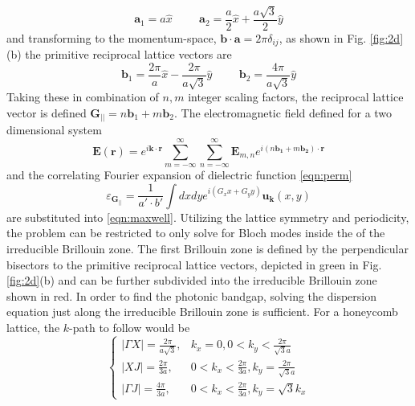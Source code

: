 \begin{equation}
	\boldsymbol{a}_1 = a\hat{x} \hspace{1cm} \boldsymbol{a}_2 = \frac{a}{2}\hat{x}+\frac{a\sqrt{3}}{2}\hat{y}
\end{equation}
and transforming to the momentum-space,  $\boldsymbol{b}\cdot\boldsymbol{a} = 2\pi\delta_{ij}$, as shown in Fig. \ref{fig:2d}(b) the primitive reciprocal lattice vectors are
\begin{equation}
	\boldsymbol{b}_1 = \frac{2\pi}{a}\hat{x}-\frac{2\pi}{a\sqrt{3}}\hat{y} \hspace{1cm} \boldsymbol{b}_2 =\frac{4\pi}{a\sqrt{3}}\hat{y}
\end{equation}
Taking these in combination of $n, m$ integer scaling factors, the reciprocal lattice vector is defined $\boldsymbol{G_{||}} = n\boldsymbol{b}_1 + m\boldsymbol{b}_2$.
The electromagnetic field defined for a two dimensional system
\begin{equation}
	\boldsymbol{E}(\boldsymbol{r}) = e^{i\boldsymbol{k}\cdot\boldsymbol{r}}
	\sum_{m=-\infty}^\infty\sum_{n=-\infty}^\infty\boldsymbol{E}_{m,n}
	e^{i(n\boldsymbol{b_1}+m\boldsymbol{b_2})\cdot\boldsymbol{r}}
	\label{eqn:2d_emf}
\end{equation}
and the correlating Fourier expansion of dielectric function \eqref{eqn:perm}
\begin{equation}
	\varepsilon_{\boldsymbol{G_{||}}} = \frac{1}{a'\cdot b'}\int dxdye^{i(G_xx + G_yy)}\boldsymbol{u_k}(x, y)
	\label{eqn:2d_perm}
\end{equation}
are substituted into \eqref{eqn:maxwell}.
Utilizing the lattice symmetry and periodicity, the problem can be restricted to only solve for Bloch modes inside the of the irreducible Brillouin zone.
The first Brillouin zone is defined by the perpendicular bisectors to the primitive reciprocal lattice vectors, depicted in green in Fig. \ref{fig:2d}(b) and can be further subdivided into the irreducible Brillouin zone shown in red.
In order to find the photonic bandgap, solving the dispersion equation just along the irreducible Brillouin zone is sufficient.
For a honeycomb lattice, the $k$-path to follow would be
\begin{equation}
	\begin{cases}
		|\Gamma X| = \frac{2\pi}{a\sqrt{3}}, & k_x=0, 0<k_y<\frac{2\pi}{\sqrt{3}a}               \\
		|XJ| =  \frac{2\pi}{3a},             & 0<k_x<\frac{2\pi}{3a}, k_y=\frac{2\pi}{\sqrt{3}a} \\
		|\Gamma J| = \frac{4\pi}{3a},        & 0<k_x<\frac{2\pi}{3a}, k_y=\sqrt{3}k_x
	\end{cases}
\end{equation}
